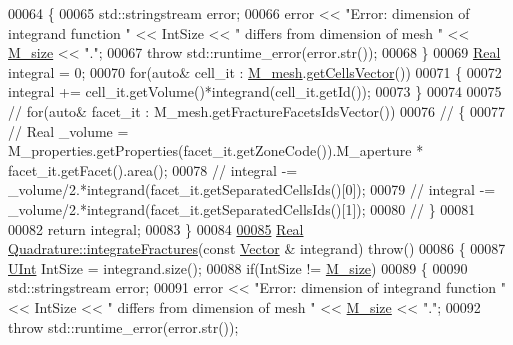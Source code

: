 \begin{DoxyCode}
00064     \{
00065         std::stringstream error;
00066         error << \textcolor{stringliteral}{"Error: dimension of integrand function "} << IntSize << \textcolor{stringliteral}{" differs from dimension of mesh "}
       << \hyperlink{classFVCode3D_1_1Quadrature_ae0ab248f031fa026887c4e1fb91a3835}{M\_size} << \textcolor{stringliteral}{"."};
00067         \textcolor{keywordflow}{throw} std::runtime\_error(error.str());
00068     \}
00069     \hyperlink{namespaceFVCode3D_a40c1f5588a248569d80aa5f867080e83}{Real} integral = 0;
00070     \textcolor{keywordflow}{for}(\textcolor{keyword}{auto}& cell\_it : \hyperlink{classFVCode3D_1_1Quadrature_abaa2519ea32065df30242bd5f5cb2d01}{M\_mesh}.\hyperlink{classFVCode3D_1_1Rigid__Mesh_afefb62f2c37317402b495e2369ed495b}{getCellsVector}())
00071     \{
00072         integral += cell\_it.getVolume()*integrand(cell\_it.getId());
00073     \}
00074 
00075 \textcolor{comment}{//    for(auto& facet\_it : M\_mesh.getFractureFacetsIdsVector())}
00076 \textcolor{comment}{//    \{}
00077 \textcolor{comment}{//        Real \_volume = M\_properties.getProperties(facet\_it.getZoneCode()).M\_aperture *
       facet\_it.getFacet().area();}
00078 \textcolor{comment}{//        integral -= \_volume/2.*integrand(facet\_it.getSeparatedCellsIds()[0]);}
00079 \textcolor{comment}{//        integral -= \_volume/2.*integrand(facet\_it.getSeparatedCellsIds()[1]);}
00080 \textcolor{comment}{//    \}}
00081 
00082     \textcolor{keywordflow}{return} integral;
00083 \}
00084 
\hypertarget{Quadrature_8cpp_source.tex_l00085}{}\hyperlink{classFVCode3D_1_1Quadrature_ad214edec7046612f3a020199648c321c}{00085} \hyperlink{namespaceFVCode3D_a40c1f5588a248569d80aa5f867080e83}{Real} \hyperlink{classFVCode3D_1_1Quadrature_a18e580bc530cfc004154b0e48a8617e7}{Quadrature::integrateFractures}(\textcolor{keyword}{const} 
      \hyperlink{namespaceFVCode3D_a16ccf345652402bccd1a5d2e6782526c}{Vector} & integrand) \textcolor{keywordflow}{throw}()
00086 \{
00087     \hyperlink{namespaceFVCode3D_a4bf7e328c75d0fd504050d040ebe9eda}{UInt} IntSize = integrand.size();
00088     \textcolor{keywordflow}{if}(IntSize != \hyperlink{classFVCode3D_1_1Quadrature_ae0ab248f031fa026887c4e1fb91a3835}{M\_size})
00089     \{
00090         std::stringstream error;
00091         error << \textcolor{stringliteral}{"Error: dimension of integrand function "} << IntSize << \textcolor{stringliteral}{" differs from dimension of mesh "}
       << \hyperlink{classFVCode3D_1_1Quadrature_ae0ab248f031fa026887c4e1fb91a3835}{M\_size} << \textcolor{stringliteral}{"."};
00092         \textcolor{keywordflow}{throw} std::runtime\_error(error.str());

\end{DoxyCode}
